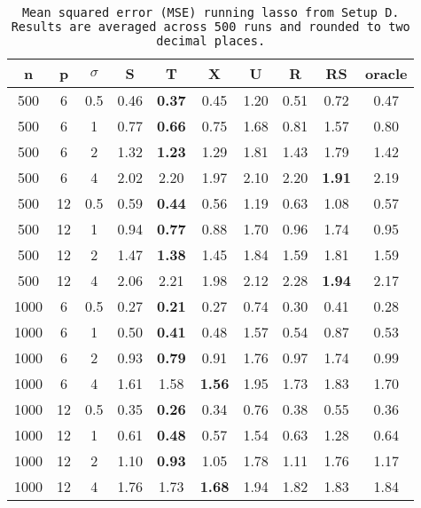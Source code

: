 \begin{table}[ht]
\centering
\begin{tabular}{cccccccccc}
  \hline
n & p & $\sigma$ & S & T & X & U & R & RS & oracle \\ 
  \hline
500 & 6 & 0.5 & 0.46 & \bf 0.37 & 0.45 & 1.20 & 0.51 & 0.72 & 0.47 \\ 
  500 & 6 & 1 & 0.77 & \bf 0.66 & 0.75 & 1.68 & 0.81 & 1.57 & 0.80 \\ 
  500 & 6 & 2 & 1.32 & \bf 1.23 & 1.29 & 1.81 & 1.43 & 1.79 & 1.42 \\ 
  500 & 6 & 4 & 2.02 & 2.20 & 1.97 & 2.10 & 2.20 & \bf 1.91 & 2.19 \\ 
  500 & 12 & 0.5 & 0.59 & \bf 0.44 & 0.56 & 1.19 & 0.63 & 1.08 & 0.57 \\ 
  500 & 12 & 1 & 0.94 & \bf 0.77 & 0.88 & 1.70 & 0.96 & 1.74 & 0.95 \\ 
  500 & 12 & 2 & 1.47 & \bf 1.38 & 1.45 & 1.84 & 1.59 & 1.81 & 1.59 \\ 
  500 & 12 & 4 & 2.06 & 2.21 & 1.98 & 2.12 & 2.28 & \bf 1.94 & 2.17 \\ 
  1000 & 6 & 0.5 & 0.27 & \bf 0.21 & 0.27 & 0.74 & 0.30 & 0.41 & 0.28 \\ 
  1000 & 6 & 1 & 0.50 & \bf 0.41 & 0.48 & 1.57 & 0.54 & 0.87 & 0.53 \\ 
  1000 & 6 & 2 & 0.93 & \bf 0.79 & 0.91 & 1.76 & 0.97 & 1.74 & 0.99 \\ 
  1000 & 6 & 4 & 1.61 & 1.58 & \bf 1.56 & 1.95 & 1.73 & 1.83 & 1.70 \\ 
  1000 & 12 & 0.5 & 0.35 & \bf 0.26 & 0.34 & 0.76 & 0.38 & 0.55 & 0.36 \\ 
  1000 & 12 & 1 & 0.61 & \bf 0.48 & 0.57 & 1.54 & 0.63 & 1.28 & 0.64 \\ 
  1000 & 12 & 2 & 1.10 & \bf 0.93 & 1.05 & 1.78 & 1.11 & 1.76 & 1.17 \\ 
  1000 & 12 & 4 & 1.76 & 1.73 & \bf 1.68 & 1.94 & 1.82 & 1.83 & 1.84 \\ 
   \hline
\end{tabular}
\caption{\tt Mean squared error (MSE) running \texttt{lasso} from Setup D. Results are averaged across 500 runs and rounded to two decimal places.} 
\label{table:setup4}
\end{table}
